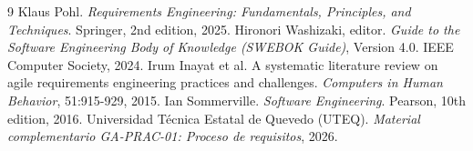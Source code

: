 \documentclass{article}
\begin{document}
\begin{thebibliography}{9}
 Klaus Pohl. \emph{Requirements Engineering: Fundamentals, Principles, and Techniques}. Springer, 2nd edition, 2025.
 Hironori Washizaki, editor. \emph{Guide to the Software Engineering Body of Knowledge (SWEBOK Guide)}, Version 4.0. IEEE Computer Society, 2024.
 Irum Inayat et al. A systematic literature review on agile requirements engineering practices and challenges. \emph{Computers in Human Behavior}, 51:915-929, 2015.
 Ian Sommerville. \emph{Software Engineering}. Pearson, 10th edition, 2016.
 Universidad Técnica Estatal de Quevedo (UTEQ). \emph{Material complementario GA-PRAC-01: Proceso de requisitos}, 2026.
\end{thebibliography}
\end{document}
